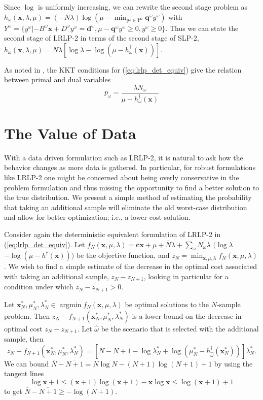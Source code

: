 \documentclass{iserc}
\newcommand{\x}{\mathbf{x}}
\renewcommand{\c}{\mathbf{c}}
\newcommand{\q}{\mathbf{q}}
\renewcommand{\d}{\mathbf{d}}
\DeclareMathOperator*{\argmin}{argmin}
\begin{document}
Since $\log$ is uniformly increasing, we can rewrite the second stage problem as $h_\omega(\x,\lambda,\mu) = (-N\lambda) \log(\mu - \min_{y^\omega \in Y^\omega} \q^\omega y^\omega )$ with $Y^\omega = \{y^\omega | -B^\omega \x + D^\omega y^\omega = \d^\omega, \mu - \q^\omega y^\omega \geq 0, y^\omega \geq 0\}$.
Thus we can state the second stage of LRLP-2 in terms of the second stage of SLP-2, $h_\omega(\x,\lambda,\mu) = N\lambda\left[\log\lambda - \log(\mu - h^\dagger_\omega(\x))\right]$.

As noted in \cite{wang2010likelihood}, the KKT conditions for (\ref{eq:lrlp_det_equiv}) give the relation between primal and dual variables
\begin{equation}
	p_\omega = \frac{\lambda N_\omega}{\mu - h^\dagger_\omega(\x)} \label{eq:kkt}
\end{equation}

\section{The Value of Data} \label{sec:value}

With a data driven formulation such as LRLP-2, it is natural to ask how the behavior changes as more data is gathered.
In particular, for robust formulations like LRLP-2 one might be concerned about being overly conservative in the problem formulation and thus missing the opportunity to find a better solution to the true distribution.
We present a simple method of estimating the probability that taking an additional sample will eliminate the old worst-case distribution and allow for better optimization; i.e., a lower cost solution.

Consider again the deterministic equivalent formulation of LRLP-2 in (\ref{eq:lrlp_det_equiv}).
Let $f_N(\x,\mu,\lambda) =  \c\x + \mu + \bar{N}\lambda + \sum_\omega N_\omega\lambda$ $(\log\lambda$ $- \log(\mu-h^\dagger(\x)))$ be the objective function, and $z_N = \min_{\x,\mu,\lambda} f_N(\x,\mu,\lambda)$.
We wish to find a simple estimate of the decrease in the optimal cost associated with taking an additional sample, $z_N - z_{N+1}$, looking in particular for a condition under which $z_N - z_{N+1} > 0$.

Let $\x^*_N, \mu^*_N,\lambda^*_N \in \argmin f_N(\x,\mu,\lambda)$ be optimal solutions to the $N$-sample problem.
Then $z_N - f_{N+1}(\x^*_N,\mu^*_N,\lambda^*_N)$ is a lower bound on the decrease in optimal cost $z_N - z_{N+1}$.
Let $\hat{\omega}$ be the scenario that is selected with the additional sample, then 
\[
	z_N - f_{N+1}(\x^*_N,\mu^*_N,\lambda^*_N) = \left[ \overline{N} - \overline{N+1} - \log \lambda^*_N + \log(\mu^*_N - h^\dagger_{\hat{\omega}}(\x^*_N)) \right] \lambda^*_N.
\]
We can bound $\overline{N} - \overline{N+1} = N\log N - (N+1)\log(N+1) + 1$ by using the tangent lines
\[
	\log \x + 1 \leq (\x+1)\log(\x+1) - \x\log \x \leq \log(\x+1) + 1
\]
to get $\overline{N} - \overline{N+1} \geq -\log(N+1)$.
\end{document}
